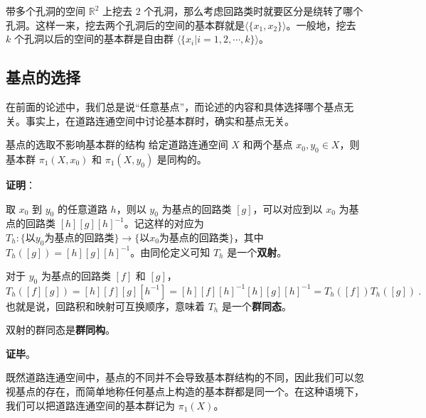 \begin{example}{带多个孔洞的空间}
$\mathbb{R}^2$ 上挖去 $2$ 个孔洞，那么考虑回路类时就要区分是绕转了哪个孔洞。这样一来，挖去两个孔洞后的空间的基本群就是$\langle\{x_1, x_2\}\rangle$。一般地，挖去 $k$ 个孔洞以后的空间的基本群是自由群 $\langle\{x_i|i=1, 2, \cdots, k\}\rangle$。
\end{example}

\subsection{基点的选择}

在前面的论述中，我们总是说“任意基点”，而论述的内容和具体选择哪个基点无关。事实上，在道路连通空间中讨论基本群时，确实和基点无关。

\begin{theorem}{基点的选取不影响基本群的结构}
给定道路连通空间 $X$ 和两个基点 $x_0, y_0\in X$，则基本群 $\pi_1(X, x_0)$ 和 $\pi_1(X, y_0)$ 是同构的。
\end{theorem}

\textbf{证明}：

取 $x_0$ 到 $y_0$ 的任意道路 $h$，则以 $y_0$ 为基点的回路类 $[g]$，可以对应到以 $x_0$ 为基点的回路类 $[h][g][h]^{-1}$。记这样的对应为 $T_h: \{\text{以} y_0 \text{为基点的回路类}\}\rightarrow\{\text{以} x_0 \text{为基点的回路类}\}$，其中 $T_h([g])=[h][g][h]^{-1}$。由同伦定义可知 $T_h$ 是一个\textbf{双射}。

对于 $y_0$ 为基点的回路类 $[f]$ 和 $[g]$，$$T_h([f][g])=[h][f][g][h^{-1}]=[h][f][h]^{-1}[h][g][h]^{-1}=T_h([f])T_h([g])~.$$
也就是说，回路积和映射可互换顺序，意味着 $T_h$ 是一个\textbf{群同态}。

双射的群同态是\textbf{群同构}。

\textbf{证毕}。

既然道路连通空间中，基点的不同并不会导致基本群结构的不同，因此我们可以忽视基点的存在，而简单地称任何基点上构造的基本群都是同一个。在这种语境下，我们可以把道路连通空间的基本群记为 $\pi_1(X)$。


